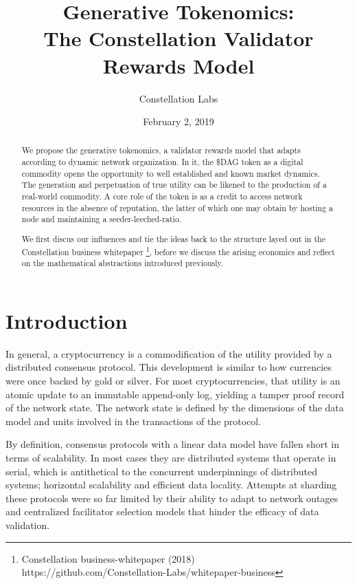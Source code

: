 \documentclass{article}
\title{Generative Tokenomics:\\ The Constellation Validator Rewards Model}
\author{Constellation Labs}
\date{February 2, 2019}
\begin{document}
\maketitle

\begin{abstract}
We propose the generative tokenomics, a validator rewards model that adapts according to dynamic network organization. In it, the \$DAG token as a digital commodity opens the opportunity to well established and known market dynamics. The generation and perpetuation of true utility can be likened to the production of a real-world commodity. A core role of the token is as a credit to access network resources in the absence of reputation, the latter of which one may obtain by hosting a node and maintaining a seeder-leeched-ratio.

We first discus our influences and tie the ideas back to the structure layed out in the Constellation business whitepaper
\footnote{Constellation business-whitepaper (2018)\\ https://github.com/Constellation-Labs/whitepaper-business}, 
before we discuss the arising economics and reflect on the mathematical abstractions introduced previously. 
\end{abstract}

\tableofcontents

\setcounter{secnumdepth}{0}
\section{Introduction}
In general, a cryptocurrency is a commodification of the utility provided by a distributed consensus protocol. This development is similar to how currencies were once backed by gold or silver. For most cryptocurrencies, that utility is an atomic update to an immutable append-only log, yielding a tamper proof record of the network state. The network state is defined by the dimensions of the data model and units involved in the transactions of the protocol. 

By definition, consensus protocols with a linear data model have fallen short in terms of scalability. In most cases they are distributed systems that operate in serial, which is antithetical to the concurrent underpinnings of distributed systems; horizontal scalability and efficient data locality. Attempts at sharding these protocols were so far limited by their ability to adapt to network outages and centralized facilitator selection models that hinder the efficacy of data validation. 
\end{document}
